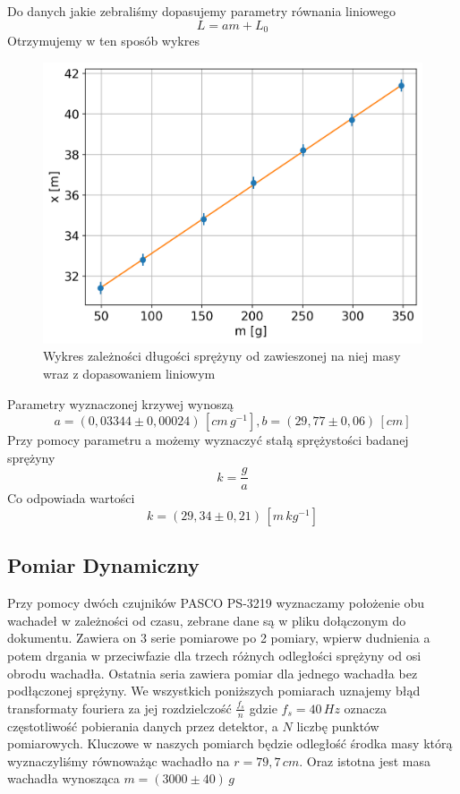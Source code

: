 \documentclass[12pt]{article}
\begin{document}
Do danych jakie zebraliśmy dopasujemy parametry równania liniowego
\[
    L = a m + L_0
\]
Otrzymujemy w ten sposób wykres
\begin{figure}[H]
    \centering
    \includegraphics[width=\linewidth]{spring_mass}
    \caption{Wykres zależności długości sprężyny od zawieszonej na niej masy wraz z dopasowaniem liniowym}
    \label{fig:spring_mass}
\end{figure}
Parametry wyznaczonej krzywej wynoszą
\[
    a = (0{,}03344 \pm 0{,}00024) \, [cm \, g^{-1}], b = (29{,}77 \pm 0{,}06) \, [cm]
\]
Przy pomocy parametru a możemy wyznaczyć stałą sprężystości badanej sprężyny
\[
    k = \frac{g}{a}
\]
Co odpowiada wartości
\[
    k = (29{,}34 \pm 0{,}21) \, [m \, kg^{-1}]
\]



\subsection{Pomiar Dynamiczny}
Przy pomocy dwóch czujników PASCO PS-3219 wyznaczamy położenie obu wachadeł w zależności od czasu, zebrane dane są w pliku dołączonym do dokumentu. Zawiera on 3 serie pomiarowe po 2 pomiary, wpierw dudnienia a potem drgania w przeciwfazie dla trzech różnych odległości sprężyny od osi obrodu wachadła. Ostatnia seria zawiera pomiar dla jednego wachadła bez podłączonej sprężyny. We wszystkich poniższych pomiarach uznajemy błąd transformaty fouriera za jej rozdzielczość \(\frac{f_s}{n}\) gdzie \(f_s = 40 \, Hz\) oznacza częstotliwość pobierania danych przez detektor, a \(N\) liczbę punktów pomiarowych. Kluczowe w naszych pomiarch będzie odległość środka masy którą wyznaczyliśmy równoważąc wachadło na \(r = 79{,}7 \, cm\). Oraz istotna jest masa wachadła wynosząca \(m = (3000 \pm 40) \, g\)
\end{document}
